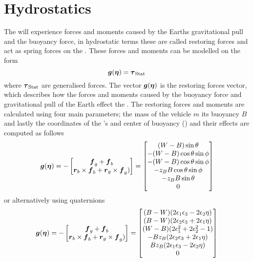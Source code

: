 \section{Hydrostatics}
The \abbrROV will experience forces and moments caused by the Earths gravitational pull and the buoyancy force, in hydrostatic terms these are called restoring forces and act as spring forces on the \abbrROV \citep{fossen2011}. These forces and moments can be modelled on the form 
\begin{equation}\label{eq:stat}
\boldsymbol{g}(\boldsymbol{\eta}) = \boldsymbol{\tau}_{\text{Stat}}
\end{equation} where $\boldsymbol{\tau}_{\text{Stat}}$ are generalised forces. The vector $\boldsymbol{g}(\boldsymbol{\eta})$ is the restoring forces vector, which describes how the forces and moments caused by the buoyancy force and gravitational pull of the Earth effect the \abbrROV. The restoring forces and moments are calculated using four main parameters; the mass of the vehicle $m$ its buoyancy $B$ and lastly the coordinates of the \abbrROV's \abbrCG and center of buoyancy (\abbrCB) and their effects are computed as follows
\begin{equation} \label{eq:restoring_forces}
    \boldsymbol{g}(\boldsymbol{\eta}) = -
     \begin{bmatrix}
    \boldsymbol{f}_g + \boldsymbol{f}_b \\
    \boldsymbol{r}_b \times \boldsymbol{f}_b + \boldsymbol{r}_g \times \boldsymbol{f}_g) 
     \end{bmatrix} 
     =
    \begin{bmatrix}
        (W - B) \sin \theta\\
    -(W - B) \cos \theta \sin \phi\\
    -(W - B) \cos \theta \sin \phi\\
    -z_B B \cos \theta \sin \phi\\
    -z_B B \sin \theta\\
    0\\
    \end{bmatrix}
\end{equation}
or alternatively using quaternions 
\begin{equation}\label{eq:restoring_forces_quat}
    \boldsymbol{g}(\boldsymbol{\eta}) = -
    \begin{bmatrix}
    \boldsymbol{f}_g + \boldsymbol{f}_b \\
    \boldsymbol{r}_b \times \boldsymbol{f}_b + \boldsymbol{r}_g \times \boldsymbol{f}_g) 
     \end{bmatrix} = 
    \begin{bmatrix}
	(B - W) (2 \epsilon_1 \epsilon_3 - 2 \epsilon_2 \eta) 	\\
    (B - W) (2 \epsilon_2 \epsilon_3 + 2 \epsilon_1 \eta) 	\\
 	(W - B)(2 \epsilon_1^2 + 2\epsilon_2^2 - 1)				\\
 	-B z_B (2 \epsilon_2 \epsilon_3 + 2 \epsilon_1 \eta)	\\
  	B z_B (2 \epsilon_1 \epsilon_3 - 2 \epsilon_2 \eta)		\\
    0
    \end{bmatrix}
\end{equation}
